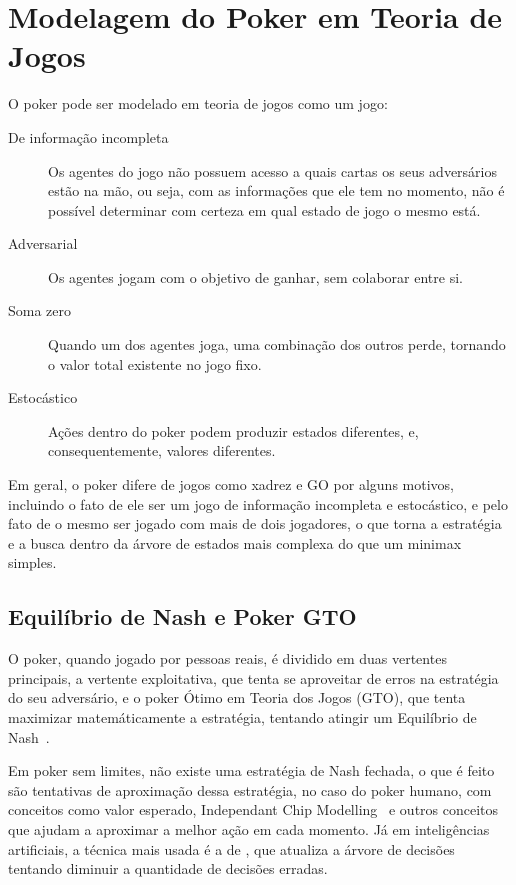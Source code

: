\documentclass[twocolumn]{article}
\theoremstyle{mytheoremstyle}
\theoremstyle{mytheoremstyle}
\theoremstyle{myproblemstyle}
\begin{document}
    \section{Modelagem do Poker em Teoria de Jogos } %
    \label{sec:Modelagem do Poker em Teoria de Jogos }
        O poker pode ser modelado em teoria de jogos como um jogo:


        \begin{description}
            \item[De informação incompleta] Os agentes do jogo não possuem acesso a quais cartas os seus adversários estão na mão, ou seja,
                com as informações que ele tem no momento, não é possível determinar com certeza em qual estado de jogo o mesmo está.

            \item[Adversarial] Os agentes jogam com o objetivo de ganhar, sem colaborar entre si.

            \item[Soma zero] Quando um dos agentes joga, uma combinação dos outros perde, tornando o valor total existente no jogo fixo.

            \item[Estocástico] Ações dentro do poker podem produzir estados diferentes, e, consequentemente, valores diferentes.
        \end{description}

        Em geral, o poker difere de jogos como xadrez e GO por alguns motivos, incluindo o fato de ele ser um jogo de informação incompleta
        e estocástico, e pelo fato de o mesmo ser jogado com mais de dois jogadores, o que torna a estratégia e a busca dentro da árvore de estados
        mais complexa do que um minimax simples.

        \subsection{Equilíbrio de Nash e Poker GTO} %
        \label{ssub:Equilíbrio de Nash e Poker GTO}
            O poker, quando jogado por pessoas reais, é dividido em duas vertentes principais, a vertente exploitativa, que tenta se aproveitar
            de erros na estratégia do seu adversário, e o poker Ótimo em Teoria dos Jogos (GTO), que tenta maximizar matemáticamente a estratégia,
            tentando atingir um Equilíbrio de Nash~\cite{nash1950equilibrium}.

            Em poker sem limites, não existe uma estratégia de Nash fechada, o que é feito são tentativas de aproximação dessa estratégia,
            no caso do poker humano, com conceitos como valor esperado, Independant Chip Modelling~\cite{gilbert2009independent} e outros conceitos
            que ajudam a aproximar a melhor ação em cada momento. Já em inteligências artificiais, a técnica mais usada é a de , que atualiza a árvore de decisões tentando diminuir a quantidade de decisões erradas.
\end{document}

